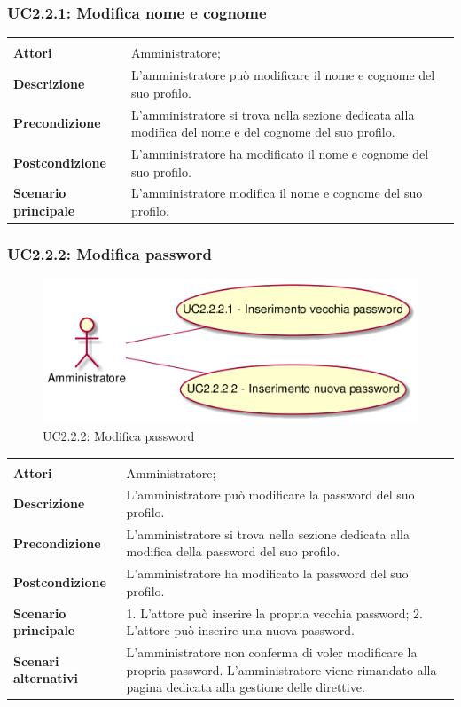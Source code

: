 \subsubsection{UC2.2.1: Modifica nome e cognome}
\label{UC2.2.1}
\begin{longtable}{l|p{10cm}}
\hline
&\\
\textbf{Attori} & Amministratore;\\[7pt]
\textbf{Descrizione} & L'amministratore può modificare il nome e cognome del suo profilo.\\[7pt]
\textbf{Precondizione} & L'amministratore si trova nella sezione dedicata alla modifica del nome e del cognome del suo profilo.\\[7pt]
\textbf{Postcondizione} & L'amministratore ha modificato il nome e cognome del suo profilo.\\[7pt]
\textbf{Scenario principale} & L'amministratore modifica il nome e cognome del suo profilo.\\[7pt]\hline
\end{longtable}

\subsubsection{UC2.2.2: Modifica password}
\label{UC2.2.2}\newpage
\begin{figure}[h]
\centering
\includegraphics[width=\textwidth,height=\textheight,keepaspectratio]{images/UseCaseUC2.2.2.png}
\caption{UC2.2.2: Modifica password}
\end{figure}
\begin{longtable}{l|p{10cm}}
\hline
&\\
\textbf{Attori} & Amministratore;\\[7pt]
\textbf{Descrizione} & L'amministratore può modificare la password del suo profilo.\\[7pt]
\textbf{Precondizione} & L'amministratore si trova nella sezione dedicata alla modifica della password del suo profilo.\\[7pt]
\textbf{Postcondizione} & L'amministratore ha modificato la password del suo profilo.\\[7pt]
\textbf{Scenario principale} & 1. L'attore può inserire la propria vecchia password;
2. L'attore può inserire una nuova password.\\[7pt]
\textbf{Scenari alternativi} & L'amministratore non conferma di voler modificare la propria password. L'amministratore viene rimandato alla pagina dedicata alla gestione delle direttive.\\[7pt]\hline
\end{longtable}

